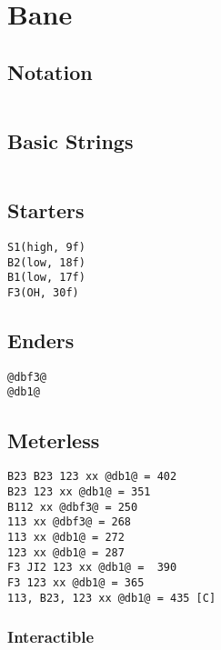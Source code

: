 \documentclass[main.tex]{subfiles}
\begin{document}
\chapter{Bane}

\section{Notation}
\begin{lstlisting}[language=FG]

\end{lstlisting}


\section{Basic Strings}

\begin{lstlisting}[language=FG]
\end{lstlisting}

\section{Starters}
\begin{lstlisting}[language=FG]
S1(high, 9f)
B2(low, 18f)
B1(low, 17f) 
F3(OH, 30f)
\end{lstlisting}

\section{Enders}
\begin{lstlisting}[language=FG]
@dbf3@
@db1@
\end{lstlisting}

\section{Meterless}


\begin{lstlisting}[language=FG]
B23 B23 123 xx @db1@ = 402 
B23 123 xx @db1@ = 351
B112 xx @dbf3@ = 250
113 xx @dbf3@ = 268
113 xx @db1@ = 272
123 xx @db1@ = 287 
F3 JI2 123 xx @db1@ =  390 
F3 123 xx @db1@ = 365 
113, B23, 123 xx @db1@ = 435 [C]
\end{lstlisting}

\subsection{Interactible}
\begin{lstlisting}[language=FG]

\end{lstlisting}
\end{document}
